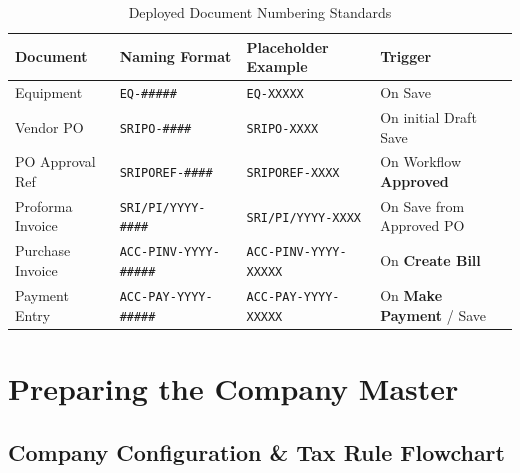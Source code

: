 \documentclass[11pt,a4paper,openany]{book}
\begin{document}
\begin{table}[htbp]
    \centering
    \caption{Deployed Document Numbering Standards}
    \label{tab:numbering}
    \begin{tabularx}{\textwidth}{l l l X}
        \toprule
        \textbf{Document} & \textbf{Naming Format} & \textbf{Placeholder Example} & \textbf{Trigger} \\
        \midrule
        Equipment\index{Equipment!Code} & \texttt{EQ-\#\#\#\#\#} & \texttt{EQ-XXXXX} & On Save \\
        Vendor PO\index{Purchase Order!Numbering} & \texttt{SRIPO-\#\#\#\#} & \texttt{SRIPO-XXXX} & On initial Draft Save \\
        PO Approval Ref\index{Purchase Order!Reference Number} & \texttt{SRIPOREF-\#\#\#\#} & \texttt{SRIPOREF-XXXX} & On Workflow \textbf{Approved} \\
        Proforma Invoice\index{Proforma Invoice!Numbering} & \texttt{SRI/PI/YYYY-\#\#\#\#} & \texttt{SRI/PI/YYYY-XXXX} & On Save from Approved PO \\
        Purchase Invoice\index{Purchase Invoice!Numbering} & \texttt{ACC-PINV-YYYY-\#\#\#\#\#} & \texttt{ACC-PINV-YYYY-XXXXX} & On \textbf{Create Bill} \\
        Payment Entry\index{Payment Entry!Numbering} & \texttt{ACC-PAY-YYYY-\#\#\#\#\#} & \texttt{ACC-PAY-YYYY-XXXXX} & On \textbf{Make Payment} / Save \\
        \bottomrule
    \end{tabularx}
\end{table}

\chapter{Preparing the Company Master}

\section{Company Configuration \& Tax Rule Flowchart}
\end{document}
